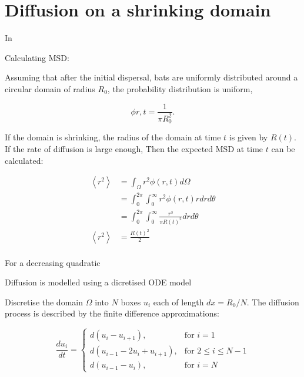 \section{Diffusion on a shrinking domain}

In

Calculating MSD:

Assuming that after the initial dispersal, bats are uniformly distributed around a circular domain of radius $R_0$, the probability distribution is uniform,

\begin{equation}
\phi{r,t} = \frac{1}{\pi R_0^2}.
\end{equation}

If the domain is shrinking, the radius of the domain at time $t$ is given by $R(t)$.
If the rate of diffusion is large enough,
Then the expected MSD at time $t$ can be calculated:


\begin{equation}
\begin{split}
\left<r^2\right> 	&= \int_{\Omega}r^2 \phi(r,t) d\Omega \\
                 	&= \int_0^{2\pi}\int_0^{\infty} r^2 \phi(r,t) r dr d\theta \\
                	&= \int_0^{2\pi}\int_0^{\infty} \frac{r^3}{\pi R(t)^2} dr d\theta \\
\left<r^2\right>	&= \frac{R(t)^2}{2}\\
\label{eqn:shrink_domain}
\end{split}
\end{equation}

For a decreasing quadratic

\cite{woolley2011stochastic}

Diffusion is modelled using a dicretised ODE model

Discretise the domain $\Omega$ into $N$ boxes $u_i$ each of length $dx=R_0/N$. The diffusion process is described by the finite difference approximations:

\begin{equation}
\frac{du_i}{dt} = \begin{cases}
		d(u_i - u_{i+1}), & \text{for } i = 1\\
		d(u_{i-1}-2u_i +u_{i+1}), & \text{for } 2 \leq i \leq N-1\\
		d(u_{i-1}-u_i), & \text{for } i = N
		\end{cases}
\end{equation}



